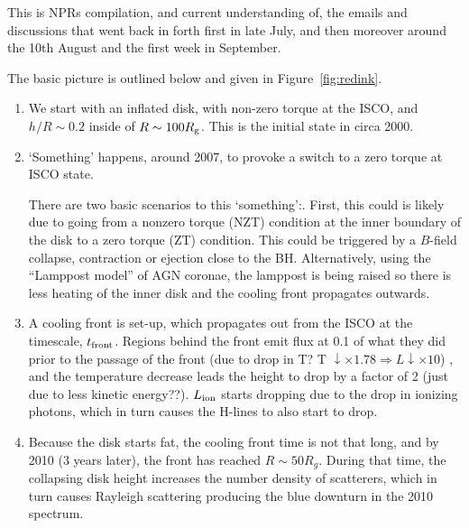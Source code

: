\documentclass[11pt,a4paper]{article}
\begin{document}

This is NPRs compilation, and current understanding of, the emails and
discussions that went back in forth first in late July, and then
moreover around the 10th August and the first week in September.

The basic picture is outlined below and given in Figure~\ref{fig:redink}. 

\begin{enumerate}
\item We start with an inflated disk, with non-zero torque at the
ISCO, and $h/R\sim0.2$ inside of $R\sim100 R_{\rm g}$.  This is the
initial state in circa 2000.

\item `Something' happens, around 2007, to provoke a switch to a zero
torque at ISCO state.

There are two basic scenarios to this `something':.  First, this could
is likely due to going from a nonzero torque (NZT) condition at the
inner boundary of the disk to a zero torque (ZT) condition. This could
be triggered by a $B$-field collapse, contraction or ejection close to
the BH.  Alternatively, using the ``Lamppost model'' of AGN coronae,
the lamppost is being raised so there is less heating of the inner
disk and the cooling front propagates outwards.
 

\item A cooling front is set-up, which propagates out from the ISCO at
the timescale, $t_{\rm front}$. Regions behind the front emit flux at
0.1 of what they did prior to the passage of the front (due to drop in
T? T $\downarrow \times 1.78 \Rightarrow L \downarrow \times10$) , and
the temperature decrease leads the height to drop by a factor of 2
(just due to less kinetic energy??).  $L_{\rm ion}$ starts dropping
due to the drop in ionizing photons, which in turn causes the H-lines
to also start to drop.

\item Because the disk starts fat, the cooling front time is not that
long, and by 2010 (3 years later), the front has reached $R\sim50
R_{g}$. During that time, the collapsing disk height increases the
number density of scatterers, which in turn causes Rayleigh scattering
producing the blue downturn in the 2010 spectrum.


\end{enumerate}
\end{document}
